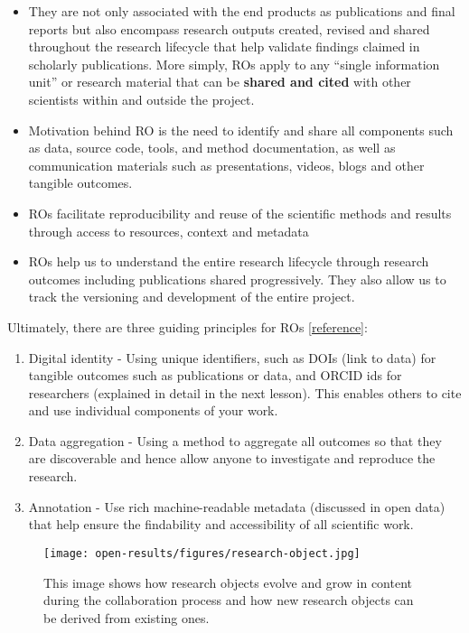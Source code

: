 \documentclass[
  letterpaper,
  DIV=11,
  numbers=noendperiod]{scrreport}
\providecommand{\tightlist}{%
  \setlength{\itemsep}{0pt}\setlength{\parskip}{0pt}}\usepackage{longtable,booktabs,array}
\begin{document}
\begin{itemize}
\tightlist
\item
  They are not only associated with the end products as publications and
  final reports but also encompass research outputs created, revised and
  shared throughout the research lifecycle that help validate findings
  claimed in scholarly publications. More simply, ROs apply to any
  ``single information unit'' or research material that can be
  \textbf{shared and cited} with other scientists within and outside the
  project.
\item
  Motivation behind RO is the need to identify and share all components
  such as data, source code, tools, and method documentation, as well as
  communication materials such as presentations, videos, blogs and other
  tangible outcomes.
\item
  ROs facilitate reproducibility and reuse of the scientific methods and
  results through access to resources, context and metadata
\item
  ROs help us to understand the entire research lifecycle through
  research outcomes including publications shared progressively. They
  also allow us to track the versioning and development of the entire
  project.
\end{itemize}

Ultimately, there are three guiding principles for ROs
{[}\href{https://the-turing-way.netlify.app/communication/research-objects.html}{reference}{]}:

\begin{enumerate}
\def\labelenumi{\arabic{enumi}.}
\tightlist
\item
  Digital identity - Using unique identifiers, such as DOIs (link to
  data) for tangible outcomes such as publications or data, and ORCID
  ids for researchers (explained in detail in the next lesson). This
  enables others to cite and use individual components of your work.
\item
  Data aggregation - Using a method to aggregate all outcomes so that
  they are discoverable and hence allow anyone to investigate and
  reproduce the research.
\item
  Annotation - Use rich machine-readable metadata (discussed in open
  data) that help ensure the findability and accessibility of all
  scientific work.
\end{enumerate}

\begin{figure}

{\centering \texttt{[image: open-results/figures/research-object.jpg]}

}

\caption{This image shows how research objects evolve and grow in
content during the collaboration process and how new research objects
can be derived from existing ones.}

\end{figure}
\end{document}

